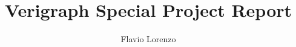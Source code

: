 

\title {Verigraph Special Project Report}
\author{Flavio Lorenzo}
\date{}


\maketitle

\tableofcontents

\pagebreak



\pagebreak



\pagebreak



\pagebreak



\pagebreak


 